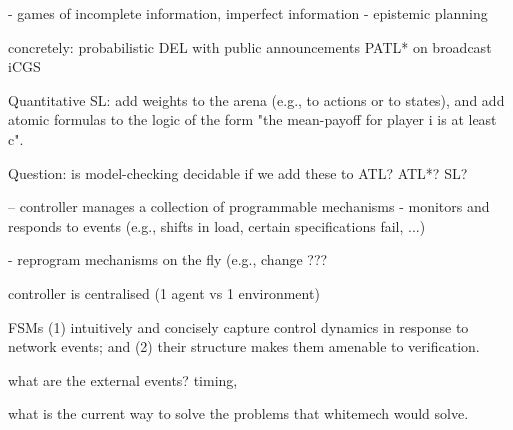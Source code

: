 \documentclass[10pt,a4paper,sans]{moderncv}
\begin{document}
- games of incomplete information, imperfect information
- epistemic planning

concretely:
probabilistic DEL with public announcements
PATL* on broadcast iCGS

Quantitative SL: add weights to the arena (e.g., to actions or to
states), and add atomic formulas to the logic of the form "the
mean-payoff for player i is at least c".

Question: is model-checking decidable if we add these to ATL? ATL*? SL?

--
controller manages a collection of programmable mechanisms
- monitors and responds to events
(e.g., shifts in load, certain specifications fail, ...)

- reprogram mechanisms on the fly
(e.g., change ???


controller is centralised (1 agent vs 1 environment)

FSMs (1) intuitively and concisely capture control dynamics in response to network events; and (2) their structure makes them amenable to verification.

what are the external events?
timing, 

what is the current way to solve the problems that whitemech would solve.




\end{document}
